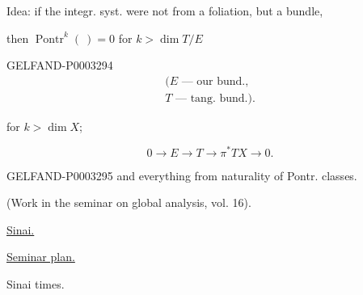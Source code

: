 Idea: if the integr. syst. were not from a foliation, but a bundle,

then $\operatorname{Pontr}^k (\ )=0$ for $k>\dim T/E$

\begin{GelfandAdjacentEvidence}{GELFAND-P000329}{4}
\begin{gather*}(E\text{ --- our bund.,}\\ T\text{ --- tang. bund.}).\end{gather*}





\end{GelfandAdjacentEvidence}


for $k>\dim X$;

\begin{equation*}0\longrightarrow E\longrightarrow T\longrightarrow\pi^*TX\longrightarrow0.\end{equation*}

\begin{GelfandAdjacentEvidence}{GELFAND-P000329}{5}
and everything from naturality of Pontr. classes.

\end{GelfandAdjacentEvidence}


(Work in the seminar on global analysis, vol. 16).

\uline{Sinai.}

\uline{Seminar plan.}

Sinai times.





